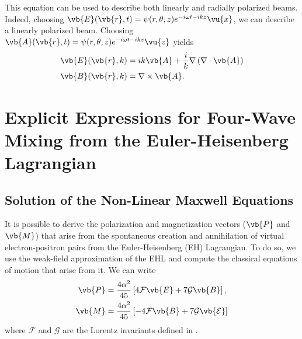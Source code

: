 \documentclass[11pt,SymmetricalJury]{inrsthesis/inrsthesis}
\begin{document}
This equation can be used to describe both linearly and radially polarized
beams. Indeed, choosing $\vb{E}(\vb{r},t)=\psi(r,\theta,z)e^{-i\omega t -ikz}\vu{x}$,
we can describe a linearly polarized beam. Choosing $\vb{A}(\vb{r},t)=\psi(r,\theta,z)e^{-i\omega t - ikz}\vu{z}$
yields
  \begin{align}
    \vb{E}(\vb{r},k) &= ik\vb{A}+\frac{i}{k}\nabla\left(\nabla\cdot\vb{A}\right) \\
    \vb{B}(\vb{r},k) &= \nabla\times\vb{A}.
  \end{align}



\chapter{Explicit Expressions for Four-Wave Mixing from the Euler-Heisenberg Lagrangian}


\section{Solution of the Non-Linear Maxwell Equations}
It is possible to derive the polarization and magnetization vectors ($\vb{P}$ and $\vb{M}$)
that arise from the spontaneous creation and annihilation of virtual electron-positron
pairs from the Euler-Heisenberg (EH) Lagrangian. To do so, we use the weak-field
approximation of the EHL and compute the classical equations of motion that arise
from it. We can write
  \begin{subequations}
  \begin{align}
    \vb{P} &= \frac{4\alpha^2}{45}\left[ 4\mathcal{F}\vb{E}+7\mathcal{G}\vb{B}\right], \label{eq:app.fwm.polarization}\\
    \vb{M} &= \frac{4\alpha^2}{45}\left[-4\mathcal{F}\vb{B}+7\mathcal{G{\vb{E}}}\right]
  \end{align}
  \end{subequations}
where $\mathcal{F}$ and $\mathcal{G}$ are the Lorentz invariants defined in \label{somewhere}.
\end{document}
